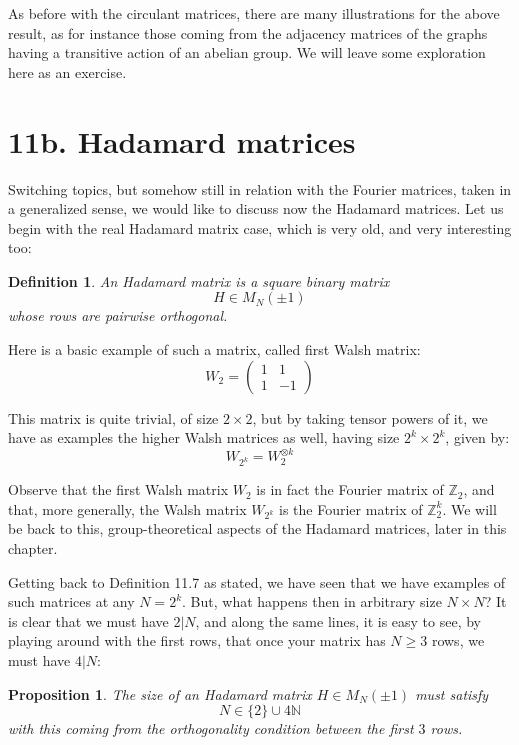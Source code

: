 \documentclass[12pt]{amsbook}
\newtheorem{definition}[theorem]{Definition}
\newtheorem{proposition}[theorem]{Proposition}
\begin{document}
As before with the circulant matrices, there are many illustrations for the above result, as for instance those coming from the adjacency matrices of the graphs having a transitive action of an abelian group. We will leave some exploration here as an exercise.

\section*{11b. Hadamard matrices}

Switching topics, but somehow still in relation with the Fourier matrices, taken in a generalized sense, we would like to discuss now the Hadamard matrices. Let us begin with the real Hadamard matrix case, which is very old, and very interesting too:

\begin{definition}
An Hadamard matrix is a square binary matrix
$$H\in M_N(\pm1)$$
whose rows are pairwise orthogonal.
\end{definition}

Here is a basic example of such a matrix, called first Walsh matrix:
$$W_2=\begin{pmatrix}1&1\\ 1&-1\end{pmatrix}$$

This matrix is quite trivial, of size $2\times2$, but by taking tensor powers of it, we have as examples the higher Walsh matrices as well, having size $2^k\times 2^k$, given by:
$$W_{2^k}=W_2^{\otimes k}$$

Observe that the first Walsh matrix $W_2$ is in fact the Fourier matrix of $\mathbb Z_2$, and that, more generally, the Walsh matrix $W_{2^k}$ is the Fourier matrix of $\mathbb Z_2^k$. We will be back to this, group-theoretical aspects of the Hadamard matrices, later in this chapter.

\bigskip

Getting back to Definition 11.7 as stated, we have seen that we have examples of such matrices at any $N=2^k$. But, what happens then in arbitrary size $N\times N$? It is clear that we must have $2|N$, and along the same lines, it is easy to see, by playing around with the first rows, that once your matrix has $N\geq3$ rows, we must have $4|N$:

\begin{proposition}
The size of an Hadamard matrix $H\in M_N(\pm1)$ must satisfy 
$$N\in\{2\}\cup 4\mathbb N$$
with this coming from the orthogonality condition between the first $3$ rows.
\end{proposition}
\end{document}
